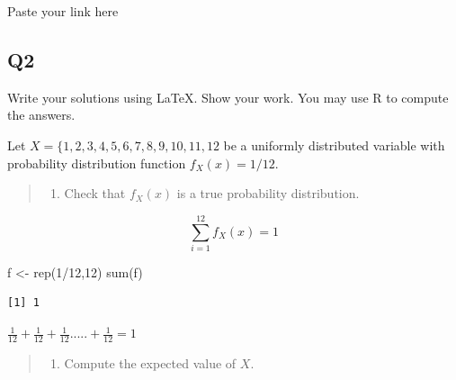 \documentclass[
]{article}
\newenvironment{Shaded}{\begin{snugshade}}{\end{snugshade}}
\newcommand{\DecValTok}[1]{\textcolor[rgb]{0.68,0.00,0.00}{#1}}
\newcommand{\FunctionTok}[1]{\textcolor[rgb]{0.28,0.35,0.67}{#1}}
\newcommand{\NormalTok}[1]{\textcolor[rgb]{0.00,0.23,0.31}{#1}}
\newcommand{\OtherTok}[1]{\textcolor[rgb]{0.00,0.23,0.31}{#1}}
\newcommand{\SpecialCharTok}[1]{\textcolor[rgb]{0.37,0.37,0.37}{#1}}
\providecommand{\tightlist}{%
  \setlength{\itemsep}{0pt}\setlength{\parskip}{0pt}}
\begin{document}
\begin{tcolorbox}[enhanced jigsaw, arc=.35mm, bottomrule=.15mm, breakable, colback=white, colframe=quarto-callout-tip-color-frame, left=2mm, leftrule=.75mm, opacityback=0, rightrule=.15mm, toprule=.15mm]

Paste your link here

\end{tcolorbox}

\subsection{Q2}\label{q2}

Write your solutions using LaTeX. Show your work. You may use R to
compute the answers.

Let \(X=\{1,2,3,4,5,6,7,8,9,10,11,12\) be a uniformly distributed
variable with probability distribution function \(f_X(x)=1/12\).

\begin{quote}
\begin{enumerate}
\def\labelenumi{(\alph{enumi})}
\tightlist
\item
  Check that \(f_X(x)\) is a true probability distribution.
\end{enumerate}
\end{quote}

\begin{tcolorbox}[enhanced jigsaw, arc=.35mm, bottomrule=.15mm, breakable, colback=white, colframe=quarto-callout-tip-color-frame, left=2mm, leftrule=.75mm, opacityback=0, rightrule=.15mm, toprule=.15mm]

\[\sum_{i=1}^{12}f_X(x)=1\]

\begin{Shaded}
\begin{Highlighting}[]
\NormalTok{f }\OtherTok{\textless{}{-}} \FunctionTok{rep}\NormalTok{(}\DecValTok{1}\SpecialCharTok{/}\DecValTok{12}\NormalTok{,}\DecValTok{12}\NormalTok{)}
\FunctionTok{sum}\NormalTok{(f)}
\end{Highlighting}
\end{Shaded}

\begin{verbatim}
[1] 1
\end{verbatim}

\(\frac{1}{12}+\frac{1}{12}+\frac{1}{12}.....+\frac{1}{12}=1\)

\end{tcolorbox}

\begin{quote}
\begin{enumerate}
\def\labelenumi{(\alph{enumi})}
\setcounter{enumi}{1}
\tightlist
\item
  Compute the expected value of \(X\).
\end{enumerate}
\end{quote}
\end{document}
